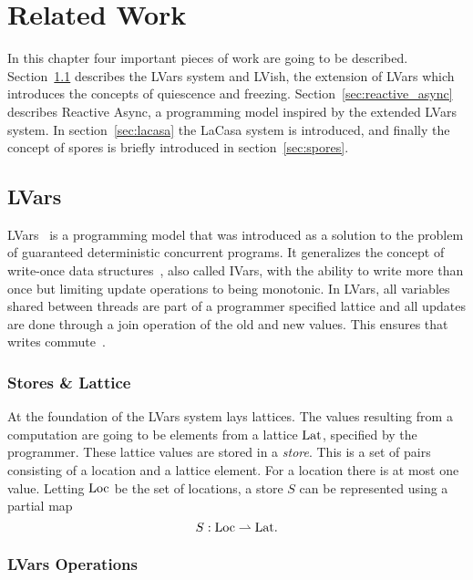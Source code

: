 \chapter{Related Work}\label{cha:related_work}

In this chapter four important pieces of work are going to be described.
Section~\ref{sec:lvars} describes the LVars system and LVish, the extension
of LVars which introduces the concepts of quiescence and freezing. 
Section~\ref{sec:reactive_async} describes Reactive Async, a programming model
inspired by the extended LVars system. In section~\ref{sec:lacasa} the LaCasa
system is introduced, and finally the concept of spores is briefly introduced in
section~\ref{sec:spores}.

\section{LVars}\label{sec:lvars}

LVars~\parencite{kuper2013lvars} is a programming model that was introduced as a
solution to the problem of guaranteed deterministic concurrent programs. It
generalizes the concept of write-once data
structures~\parencite{nikhil1989structures}, also called IVars, with the ability
to write more than once but limiting update operations to being monotonic.
In LVars, all variables shared between threads are part of a programmer
specified lattice and all updates are done through a join operation of the old
and new values. This ensures that writes commute~\parencite{kuper2013lvars}.

\subsection{Stores \& Lattice}%
\label{sub:stores_and_lattice}

At the foundation of the LVars system lays lattices. The values resulting from a
computation are going to be elements from a lattice $\mathrm{Lat}$, specified by the
programmer. These lattice values are stored in a \emph{store}.  This is a set of
pairs consisting of a location and a lattice element. For a location there is
at most one value. Letting $\mathrm{Loc}$ be the set of locations, a store $S$ can
be represented using a partial map
\begin{equation*}
  S: \mathrm{Loc} \rightharpoonup \mathrm{Lat}.
\end{equation*}

\subsection{LVars Operations}%
\label{sub:lvars_operations}

